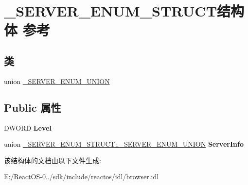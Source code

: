 \hypertarget{struct___s_e_r_v_e_r___e_n_u_m___s_t_r_u_c_t}{}\section{\+\_\+\+S\+E\+R\+V\+E\+R\+\_\+\+E\+N\+U\+M\+\_\+\+S\+T\+R\+U\+C\+T结构体 参考}
\label{struct___s_e_r_v_e_r___e_n_u_m___s_t_r_u_c_t}
\subsection*{类}
\begin{DoxyCompactItemize}
\item 
union \hyperlink{union___s_e_r_v_e_r___e_n_u_m___s_t_r_u_c_t_1_1___s_e_r_v_e_r___e_n_u_m___u_n_i_o_n}{\+\_\+\+S\+E\+R\+V\+E\+R\+\_\+\+E\+N\+U\+M\+\_\+\+U\+N\+I\+ON}
\end{DoxyCompactItemize}
\subsection*{Public 属性}
\begin{DoxyCompactItemize}
\item 
\mbox{\label{struct___s_e_r_v_e_r___e_n_u_m___s_t_r_u_c_t_abc839654a699db7abeaffd2c08305e0a}} 
D\+W\+O\+RD {\bfseries Level}
\item 
\mbox{\label{struct___s_e_r_v_e_r___e_n_u_m___s_t_r_u_c_t_a3c63d074e797c060e2525cb08ead0e3e}} 
union \hyperlink{union___s_e_r_v_e_r___e_n_u_m___s_t_r_u_c_t_1_1___s_e_r_v_e_r___e_n_u_m___u_n_i_o_n}{\+\_\+\+S\+E\+R\+V\+E\+R\+\_\+\+E\+N\+U\+M\+\_\+\+S\+T\+R\+U\+C\+T\+::\+\_\+\+S\+E\+R\+V\+E\+R\+\_\+\+E\+N\+U\+M\+\_\+\+U\+N\+I\+ON} {\bfseries Server\+Info}
\end{DoxyCompactItemize}


该结构体的文档由以下文件生成\+:\begin{DoxyCompactItemize}
\item 
E\+:/\+React\+O\+S-\/0../sdk/include/reactos/idl/browser.\+idl\end{DoxyCompactItemize}
